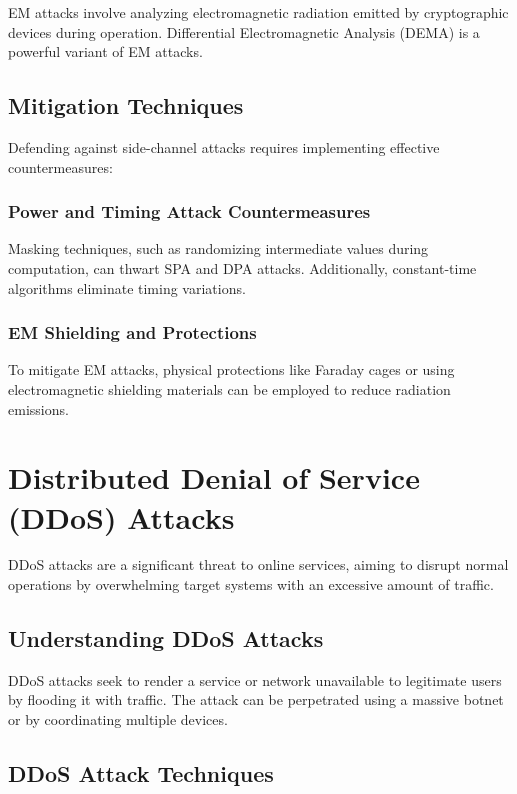 \documentclass{article}
\begin{document}
EM attacks involve analyzing electromagnetic radiation emitted by cryptographic devices during operation. Differential Electromagnetic Analysis (DEMA) is a powerful variant of EM attacks.

\subsection{Mitigation Techniques}

Defending against side-channel attacks requires implementing effective countermeasures:

\subsubsection{Power and Timing Attack Countermeasures}

Masking techniques, such as randomizing intermediate values during computation, can thwart SPA and DPA attacks. Additionally, constant-time algorithms eliminate timing variations.

\subsubsection{EM Shielding and Protections}

To mitigate EM attacks, physical protections like Faraday cages or using electromagnetic shielding materials can be employed to reduce radiation emissions.

\section{Distributed Denial of Service (DDoS) Attacks}

DDoS attacks are a significant threat to online services, aiming to disrupt normal operations by overwhelming target systems with an excessive amount of traffic.

\subsection{Understanding DDoS Attacks}

DDoS attacks seek to render a service or network unavailable to legitimate users by flooding it with traffic. The attack can be perpetrated using a massive botnet or by coordinating multiple devices.

\subsection{DDoS Attack Techniques}
\end{document}
